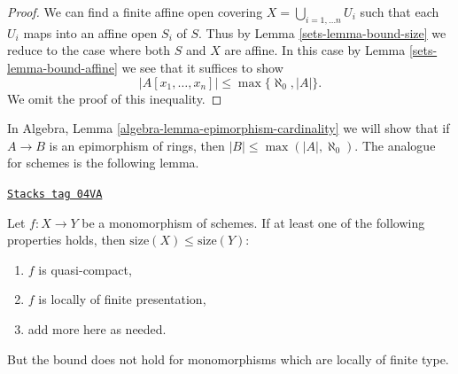\begin{proof}

We can find a finite affine open covering $X = \bigcup_{i = 1, \ldots n} U_i$
such that each $U_i$ maps into an affine open $S_i$ of $S$. Thus by
Lemma \ref{sets-lemma-bound-size}
we reduce to the case where both $S$ and $X$ are affine. In this case by
Lemma \ref{sets-lemma-bound-affine}
we see that it suffices to show
$$
|A[x_1, \ldots, x_n]| \leq \max\{\aleph_0, |A|\}.
$$
We omit the proof of this inequality.
\end{proof}

In
Algebra, Lemma \ref{algebra-lemma-epimorphism-cardinality}
we will show that if $A \to B$ is an epimorphism of rings, then
$|B| \leq \max(|A|, \aleph_0)$.
The analogue for schemes is the following lemma.

\begin{lemma}
\label{sets-lemma-bound-monomorphism}
\href{https://stacks.math.columbia.edu/tag/04VA}{\texttt{Stacks tag 04VA}}

Let $f : X \to Y$ be a monomorphism of schemes.
If at least one of the following properties
holds, then $\text{size}(X) \leq \text{size}(Y)$:
\begin{enumerate}
\item $f$ is quasi-compact,
\item $f$ is locally of finite presentation,
\item add more here as needed.
\end{enumerate}
But the bound does not hold for monomorphisms
which are locally of finite type.
\end{lemma}

